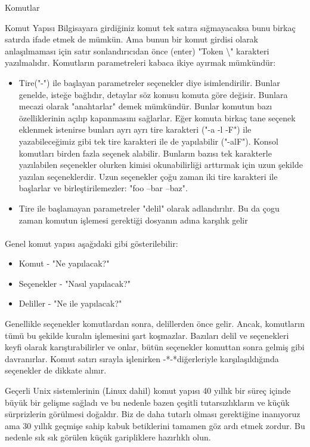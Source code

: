 \begin{section}{Komutlar}
\begin{subsection}{Komut Yapısı}
Bilgisayara girdiğiniz komut tek satıra sığmayacaksa bunu birkaç satırda ifade etmek de mümkün. Ama bunun bir komut girdisi olarak  anlaşılmaması için satır sonlandırıcıdan önce (enter) "Token \textbackslash" karakteri yazılmalıdır. Komutların parametreleri kabaca ikiye ayırmak mümkündür:
\begin{itemize}
 \item Tire("-") ile başlayan parametreler seçenekler diye isimlendirilir. Bunlar genelde, isteğe bağlıdır, detaylar söz konusu komuta göre değisir. Bunlara mecazi olarak "anahtarlar" demek mümkündür. Bunlar komutun bazı özelliklerinin açılıp kapanmasını sağlarlar. Eğer komuta birkaç tane seçenek eklenmek istenirse bunları ayrı ayrı tire karakteri ("-a -l -F") ile yazabileceğimiz gibi tek tire karakteri ile de yapılabilir ("-alF"). Konsol komutları birden fazla seçenek alabilir. Bunların bazısı tek karakterle yazılabilen seçenekler olurken kimisi okunabilirliği arttırmak için uzun şekilde yazılan seçeneklerdir. Uzun seçenekler çoğu zaman iki tire karakteri ile başlarlar ve birleştirilemezler: "foo --bar --baz".
 \item Tire ile başlamayan parametreler "delil" olarak adlandırılır. Bu da çogu zaman komutun işlemesi gerektiği dosyanın adına karşılık gelir
\end{itemize}

\paragraph{}{Genel komut yapısı aşağıdaki gibi gösterilebilir:
\begin{itemize}
\item Komut - "Ne yapılacak?"
\item Seçenekler - "Nasıl yapılacak?"
\item Deliller - "Ne ile yapılacak?"
\end{itemize}
}
\end{subsection}

Genellikle seçenekler komutlardan sonra, delillerden önce gelir. Ancak, komutların tümü bu şekilde kuralın işlemesini şart koşmazlar. Bazıları delil ve seçenekleri keyfi olarak karıştırabilirler ve onlar, bütün seçenekler komuttan sonra gelmiş gibi davranırlar. Komut satırı sırayla işlenirken -*-*diğerleriyle karşılaşıldığında seçenekler de dikkate alınır.

Geçerli Unix sistemlerinin (Linux dahil) komut yapısı 40 yıllık bir süreç içinde büyük bir gelişme sağladı ve bu nedenle bazen çeşitli tutarsızlıkların ve küçük sürprizlerin görülmesi doğaldır. Biz de daha tutarlı olması gerektiğine inanıyoruz ama 30 yıllık geçmişe sahip kabuk betiklerini tamamen göz ardı etmek zordur. Bu nedenle sık sık görülen küçük garipliklere hazırlıklı olun.


\end{section}
